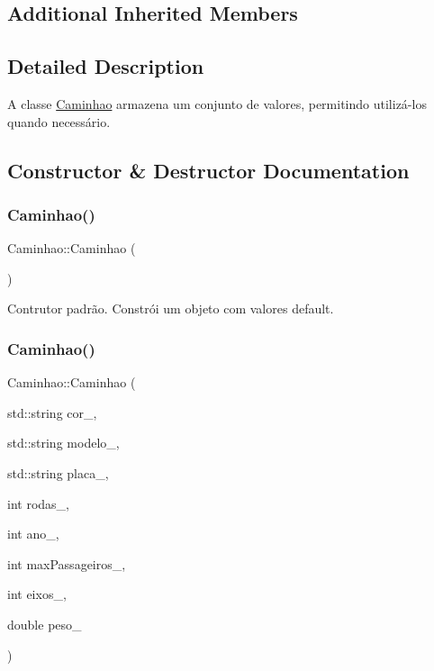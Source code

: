 \subsection*{Additional Inherited Members}


\subsection{Detailed Description}
A classe \hyperlink{classCaminhao}{Caminhao} armazena um conjunto de valores, permitindo utilizá-\/los quando necessário. 

\subsection{Constructor \& Destructor Documentation}
\mbox{\label{classCaminhao_ae2621d6abfa0d9be4c3e3d6ae44a8b88}} 
\subsubsection{\texorpdfstring{Caminhao()}{Caminhao()}\hspace{0.1cm}{\footnotesize\ttfamily [1/2]}}
{\footnotesize\ttfamily Caminhao\+::\+Caminhao (\begin{DoxyParamCaption}{ }\end{DoxyParamCaption})}

Contrutor padrão. Constrói um objeto com valores default. \mbox{\label{classCaminhao_af3cdf63c2b7ff42d61649b1fdb4b540b}} 
\subsubsection{\texorpdfstring{Caminhao()}{Caminhao()}\hspace{0.1cm}{\footnotesize\ttfamily [2/2]}}
{\footnotesize\ttfamily Caminhao\+::\+Caminhao (\begin{DoxyParamCaption}\item[{std\+::string}]{cor\+\_\+,  }\item[{std\+::string}]{modelo\+\_\+,  }\item[{std\+::string}]{placa\+\_\+,  }\item[{int}]{rodas\+\_\+,  }\item[{int}]{ano\+\_\+,  }\item[{int}]{max\+Passageiros\+\_\+,  }\item[{int}]{eixos\+\_\+,  }\item[{double}]{peso\+\_\+ }\end{DoxyParamCaption})}

